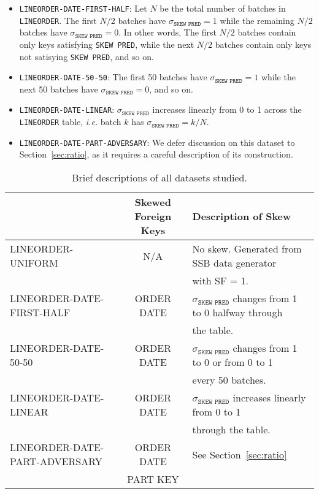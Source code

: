 \begin{itemize}
    \item \texttt{LINEORDER-DATE-FIRST-HALF}: Let $N$ be the total number of batches in \texttt{LINEORDER}. 
    The first $N/2$ batches have $\sigma_{\texttt{SKEW PRED}} = 1$ while the remaining $N/2$ batches have $\sigma_{\texttt{SKEW PRED}} = 0$.
    In other words, The first $N/2$ batches contain only keys satisfying \texttt{SKEW PRED}, 
    while the next $N/2$ batches contain only keys not satisying \texttt{SKEW PRED}, 
    and so on. 

    \item \texttt{LINEORDER-DATE-50-50}: The first 50 batches have $\sigma_{\texttt{SKEW PRED}} = 1$ while the next 50 batches have $\sigma_{\texttt{SKEW PRED}} = 0$, and so on.

    \item \texttt{LINEORDER-DATE-LINEAR}: $\sigma_{\texttt{SKEW PRED}}$ increases linearly from 0 to 1 across the \texttt{LINEORDER} table, 
    {\it i.e.} batch $k$ has $\sigma_{\texttt{SKEW PRED}} = k/N$.

    \item \texttt{LINEORDER-DATE-PART-ADVERSARY}: We defer discussion on this dataset to Section~\ref{sec:ratio}, 
    as it requires a careful description of its construction.

\end{itemize} 


\begin{table}
\begin{center}
\begin{tabular}{ |>{\ttfamily}l|>{\ttfamily}c|l| } 
\hline
{\bf Dataset Name} & {\bf Skewed Foreign Keys} & {\bf Description of Skew} \\
\hline
\hline
LINEORDER-UNIFORM& N/A & No skew. Generated from SSB data generator\\
& & with SF = 1.\\
\hline
LINEORDER-DATE-FIRST-HALF& ORDER DATE & $\sigma_{\texttt{SKEW PRED}}$ changes from 1 to 0 halfway through\\
& &  the table.\\
\hline
LINEORDER-DATE-50-50& ORDER DATE & $\sigma_{\texttt{SKEW PRED}}$ changes from 1 to 0 or from 0 to 1 \\
& & every 50 batches. \\ 
\hline
LINEORDER-DATE-LINEAR& ORDER DATE & $\sigma_{\texttt{SKEW PRED}}$ increases linearly from 0 to 1 \\
& & through the table. \\
\hline
LINEORDER-DATE-PART-ADVERSARY& ORDER DATE & See Section~\ref{sec:ratio}\\
& PART KEY & \\
\hline

\end{tabular}
\end{center}

\caption{Brief descriptions of all datasets studied.}
\label{tab:skew_datasets}
\end{table}


